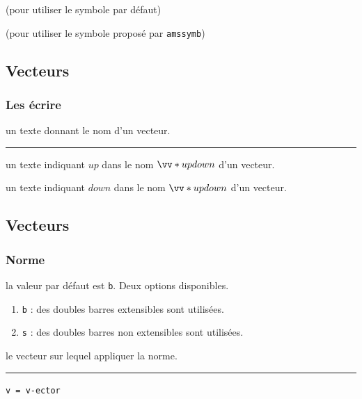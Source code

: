 \documentclass[12pt,a4paper]{book}
\theoremstyle{definition}
\newcommand\separation{
	\medskip
	\hfill\rule{0.5\textwidth}{0.75pt}\hfill
	\medskip
}
\newcommand\extraspace{
	\vspace{0.25em}
}
\newcommand\mwhyprefix[2]{%
	\texttt{#1 = #1-#2}%
}
\begin{document}
{{


\extraspace

 (pour utiliser le symbole par défaut)

 (pour utiliser le symbole proposé par \verb+amssymb+)


\subsection{Vecteurs}

\subsubsection{Les écrire}




\IDarg{} un texte donnant le nom d'un vecteur.


\separation



 un texte indiquant $up$ dans le nom $\vect*{up}{down}$ d'un vecteur.

 un texte indiquant $down$ dans le nom $\vect*{up}{down}$ d'un vecteur.


\subsection{Vecteurs}

\subsubsection{Norme}




\IDoption{} la valeur par défaut est \verb+b+. Deux options disponibles.
\begin{enumerate}
	\item \verb+b+ : des doubles barres extensibles sont utilisées.

	\item \verb+s+ : des doubles barres non extensibles sont utilisées.
\end{enumerate}


\IDarg{} le vecteur sur lequel appliquer la norme.


\separation

 \hfill \mwhyprefix{v}{ector}

}}
\end{document}
